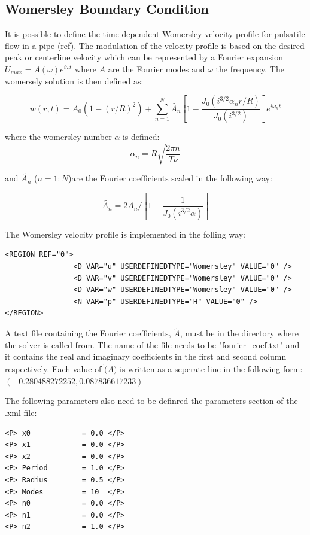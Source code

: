 \subsection{Womersley Boundary Condition}

It is possible to define the time-dependent Womersley velocity profile for pulsatile flow in a pipe (ref). The modulation of the velocity profile is based on the desired peak or centerline velocity which can be represented by a Fourier expansion $U_{max}=A(\omega)e^{i\omega t}$ where $A$ are the Fourier modes and $\omega $ the frequency. The womersely solution is then defined as:

$$ w(r,t) = A_0(1-(r/R)^2) + \sum_{n=1}^N \tilde{A_n}[1-\frac{J_0(i^{3/2}\alpha_n r/R)}{J_0(i^{3/2})}]e^{i\omega_n t} $$

where the womersley number $\alpha$ is defined:
$$ \alpha_n = R\sqrt{\frac{2\pi n}{T\nu}}$$

and $\tilde{A_n}$ ($n=1:N$)are the Fourier coefficients scaled in the following way:

$$ \tilde{A_n} = 2A_n/[1 - \frac{1}{J_0(i^{3/2}\alpha)}] $$

The Womersley velocity profile is implemented in the folling way:

\begin{lstlisting}[style=XMLStyle]
<REGION REF="0">
                <D VAR="u" USERDEFINEDTYPE="Womersley" VALUE="0" />
                <D VAR="v" USERDEFINEDTYPE="Womersley" VALUE="0" />
                <D VAR="w" USERDEFINEDTYPE="Womersley" VALUE="0" />
                <N VAR="p" USERDEFINEDTYPE="H" VALUE="0" />
</REGION>
\end{lstlisting}

A text file containing the Fourier coefficients, $\tilde{A}$, must be in the directory where the solver is called from. The name of the file needs to be "fourier\_coef.txt" and it contains the real and imaginary coefficients in the first and second column respectively. Each value of $\tilde(A)$ is written as a seperate line in the following form:
$(-0.280488272252,0.087836617233)$

The following parameters also need to be definred the parameters section of the .xml file:

\begin{lstlisting}[style=XMLStyle]
<P> x0            = 0.0 </P>
<P> x1            = 0.0 </P>
<P> x2            = 0.0 </P>
<P> Period        = 1.0 </P>
<P> Radius        = 0.5 </P>
<P> Modes         = 10  </P>
<P> n0            = 0.0 </P>
<P> n1            = 0.0 </P>
<P> n2            = 1.0 </P>
\end{lstlisting}

